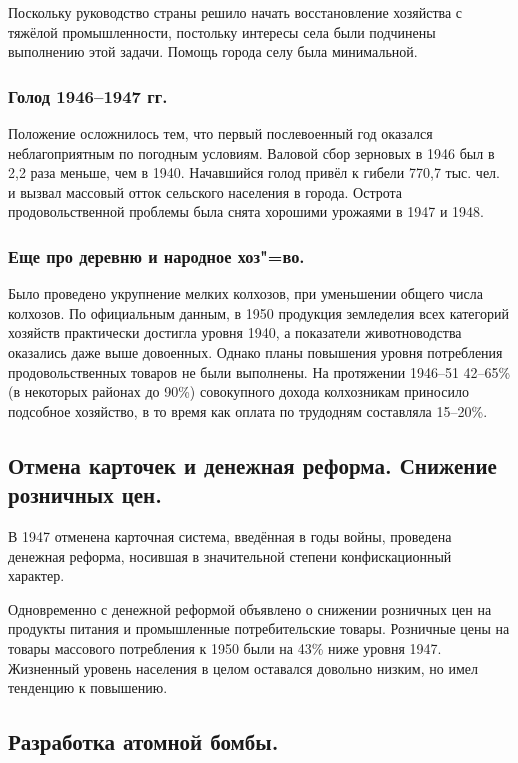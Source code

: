 Поскольку руководство страны решило начать восстановление хозяйства с тяжёлой промышленности, постольку интересы села были подчинены выполнению этой задачи. Помощь города селу была минимальной.

\subsubsection{\textbf{Голод 1946--1947 гг.}}

Положение осложнилось тем, что первый послевоенный год оказался неблагоприятным по погодным условиям. Валовой сбор зерновых в 1946 был в 2,2 раза меньше, чем в 1940. Начавшийся голод привёл к гибели 770,7 тыс. чел. и вызвал массовый отток сельского населения в города. Острота продовольственной проблемы была снята хорошими урожаями в 1947 и 1948.

\subsubsection{\textbf{Еще про деревню и народное хоз"=во.}}

Было проведено укрупнение мелких колхозов, при уменьшении общего числа колхозов. По официальным данным, в 1950 продукция земледелия всех категорий хозяйств практически достигла уровня 1940, а показатели животноводства оказались даже выше довоенных. Однако планы повышения уровня потребления продовольственных товаров не были выполнены.  На протяжении 1946–51 42–65\% (в некоторых районах до 90\%) совокупного дохода колхозникам приносило подсобное хозяйство, в то время как оплата по трудодням составляла 15–20\%.

\subsection{Отмена карточек и денежная реформа. Снижение розничных цен.}

В 1947 отменена карточная система, введённая в годы войны, проведена денежная реформа, носившая в значительной степени конфискационный характер. 

Одновременно с денежной реформой объявлено о снижении розничных цен на продукты питания и промышленные потребительские товары. Розничные цены на товары массового потребления к 1950 были на 43\% ниже уровня 1947. Жизненный уровень населения в целом оставался довольно низким, но имел тенденцию к повышению.

\subsection{Разработка атомной бомбы.}

